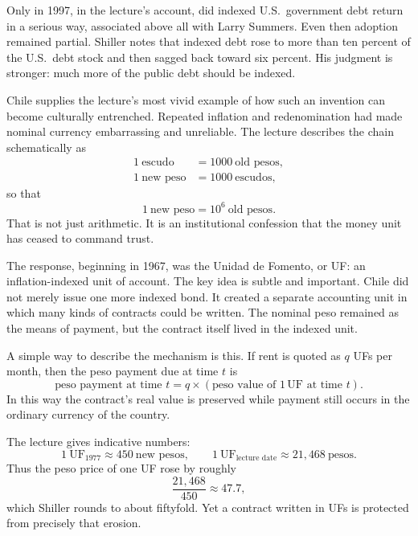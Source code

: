 Only in 1997, in the lecture's account, did indexed U.S.\ government debt return in a serious way, associated above all with Larry Summers. Even then adoption remained partial. Shiller notes that indexed debt rose to more than ten percent of the U.S.\ debt stock and then sagged back toward six percent. His judgment is stronger: much more of the public debt should be indexed.

Chile supplies the lecture's most vivid example of how such an invention can become culturally entrenched. Repeated inflation and redenomination had made nominal currency embarrassing and unreliable. The lecture describes the chain schematically as
\begin{align}
1\ \text{escudo} &= 1000\ \text{old pesos},\\
1\ \text{new peso} &= 1000\ \text{escudos},
\end{align}
so that
\begin{equation}
1\ \text{new peso}=10^6\ \text{old pesos}.
\end{equation}
That is not just arithmetic. It is an institutional confession that the money unit has ceased to command trust.

The response, beginning in 1967, was the Unidad de Fomento, or UF: an inflation-indexed unit of account. The key idea is subtle and important. Chile did not merely issue one more indexed bond. It created a separate accounting unit in which many kinds of contracts could be written. The nominal peso remained as the means of payment, but the contract itself lived in the indexed unit.

A simple way to describe the mechanism is this. If rent is quoted as $q$ UFs per month, then the peso payment due at time $t$ is
\begin{equation}
\text{peso payment at time } t = q \times (\text{peso value of } 1\,\mathrm{UF}\text{ at time } t).
\end{equation}
In this way the contract's real value is preserved while payment still occurs in the ordinary currency of the country.

The lecture gives indicative numbers:
\begin{equation}
1\ \mathrm{UF}_{1977}\approx 450\ \text{new pesos},
\qquad
1\ \mathrm{UF}_{\text{lecture date}}\approx 21{,}468\ \text{pesos}.
\end{equation}
Thus the peso price of one UF rose by roughly
\begin{equation}
\frac{21{,}468}{450}\approx 47.7,
\end{equation}
which Shiller rounds to about fiftyfold. Yet a contract written in UFs is protected from precisely that erosion.

